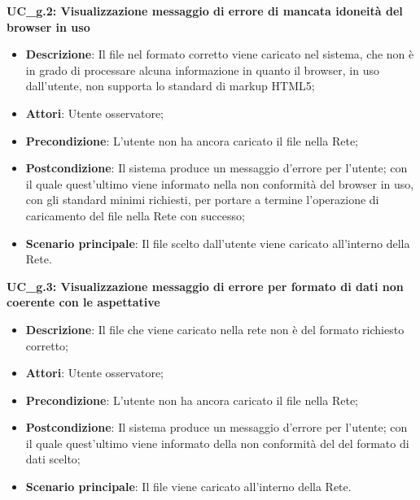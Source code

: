 \textbf{UC\_g.2: Visualizzazione messaggio di errore di mancata idoneità del browser in uso}\mbox{}
\label{UC_g.2: Visualizzazione messaggio di errore di mancata idoneita del browser in uso}
\begin{itemize}
\item \textbf{Descrizione}: Il file nel formato corretto viene caricato nel sistema, che non \`e in grado di processare alcuna informazione in quanto il browser, in uso dall'utente, non supporta lo standard di markup HTML5;
\item \textbf{Attori}: Utente osservatore;
\item \textbf{Precondizione}: L'utente non ha ancora caricato il file nella Rete;
\item \textbf{Postcondizione}: Il sistema produce un messaggio d'errore per l'utente; con il quale quest'ultimo viene informato nella non conformit\`a del browser in uso, con gli standard minimi richiesti, per portare a termine l'operazione di caricamento del file nella Rete con successo;
\item \textbf{Scenario principale}: Il file scelto dall'utente viene caricato all'interno della Rete.
\end{itemize}


\textbf{UC\_g.3: Visualizzazione messaggio di errore per formato di dati non coerente con le aspettative}\mbox{}
\label{UC_g.3: Visualizzazione messaggio di errore per formato di dati non coerente con le aspettative}
\begin{itemize}
\item \textbf{Descrizione}: Il file che viene caricato nella rete non \`e del formato richiesto corretto;
\item \textbf{Attori}: Utente osservatore;
\item \textbf{Precondizione}: L'utente non ha ancora caricato il file nella Rete;
\item \textbf{Postcondizione}: Il sistema produce un messaggio d'errore per l'utente; con il quale quest'ultimo viene informato della non conformit\`a del del formato di dati scelto;
\item \textbf{Scenario principale}: Il file viene caricato all'interno della Rete.
\end{itemize}
 
